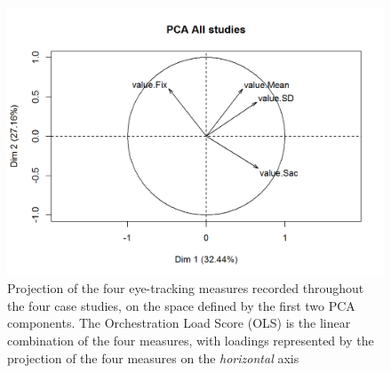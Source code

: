 \documentclass[10pt,journal,compsoc]{IEEEtran}
\begin{document}

\begin{figure}[!t]
\centering
\includegraphics[width=\linewidth]{img/PCA.png}
\caption{Projection of the four eye-tracking measures recorded throughout the four case studies, on the space defined by the first two PCA components. The Orchestration Load Score (OLS) is the linear combination of the four measures, with loadings represented by the projection of the four measures on the \textit{horizontal} axis}
\label{fig:pca}
\end{figure}
\end{document}
